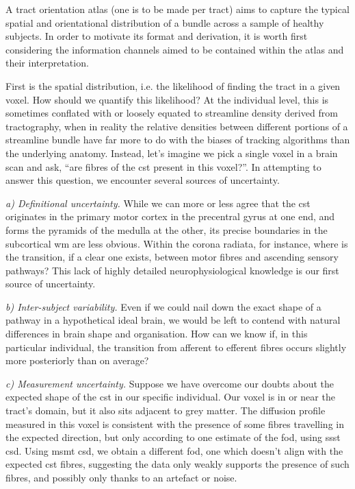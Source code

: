 A tract orientation atlas (one is to be made per tract) aims to capture the typical spatial and orientational distribution of a bundle across a sample of healthy subjects.
In order to motivate its format and derivation, it is worth first considering the information channels aimed to be contained within the atlas and their interpretation.

First is the spatial distribution, i.e. the likelihood of finding the tract in a given voxel.
How should we quantify this likelihood?
At the individual level, this is sometimes conflated with or loosely equated to streamline density derived from tractography, when in reality the relative densities between different portions of a streamline bundle have far more to do with the biases of tracking algorithms than the underlying anatomy.
Instead, let's imagine we pick a single \gls{voxel} in a brain scan and ask, ``are fibres of the \gls{cst} present in this voxel?''.
In attempting to answer this question, we encounter several sources of uncertainty.

\textit{a) Definitional uncertainty.}
While we can more or less agree that the \gls{cst} originates in the primary motor cortex in the precentral gyrus at one end, and forms the pyramids of the medulla at the other, its precise boundaries in the subcortical \gls{wm} are less obvious.
Within the corona radiata, for instance, where is the transition, if a clear one exists, between motor fibres and ascending sensory pathways?
This lack of highly detailed neurophysiological knowledge is our first source of uncertainty.

\textit{b) Inter-subject variability.}
Even if we could nail down the exact shape of a pathway in a hypothetical ideal brain, we would be left to contend with natural differences in brain shape and organisation.
How can we know if, in this particular individual, the transition from afferent to efferent fibres occurs slightly more posteriorly than on average?

\textit{c) Measurement uncertainty.}
Suppose we have overcome our doubts about the expected shape of the \gls{cst} in our specific individual.
Our voxel is in or near the tract's domain, but it also sits adjacent to grey matter.
The diffusion profile measured in this voxel is consistent with the presence of some fibres travelling in the expected direction, but only according to one estimate of the \gls{fod}, using \gls{ssst} \gls{csd}.
Using \gls{msmt} \gls{csd}, we obtain a different \gls{fod}, one which doesn't align with the expected \gls{cst} fibres, suggesting the data only weakly supports the presence of such fibres, and possibly only thanks to an artefact or noise.

